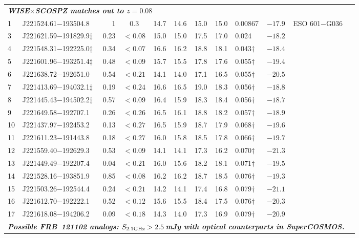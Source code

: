 \documentclass[twocolumn]{aastex63}
\begin{document}
\begin{table*}
\begin{tabular}{llrccccclllc}
\multicolumn{9}{l}{\emph{\bf WISE$\times$SCOSPZ matches out to $z=0.08$}} \\
1 & J221524.61$-$193504.8 & 1 & 0.3 & 14.7 & 14.6 & 15.0 & 15.0 & 0.00867 & $-17.9$ & ESO 601$-$G036 \\
3 & J221621.59$-$191829.9$\ddagger$ & 0.23 & $<0.08$ & 15.0 & 15.0 & 17.5 & 17.0 & 0.024 & $-18.2$ &  \\
4 & J221548.31$-$192225.0$\ddagger$ & 0.34 & $<0.07$ & 16.6 & 16.2 & 18.8 & 18.1 & 0.043$\dagger$ & $-18.4$ \\
5 & J221601.96$-$193251.4$\ddagger$ & 0.48 & $<0.09$ & 15.7 & 15.5 & 17.8 & 17.6 & 0.055$\dagger$ & $-19.4$ \\
6 & J221638.72$-$192651.0 & 0.54 & $<0.21$ & 14.1 & 14.0 & 17.1 & 16.5 & 0.055$\dagger$ & $-20.5$\\
7 & J221413.69$-$194032.1$\ddagger$ & 0.19 & $<0.24$ & 16.6 & 16.5 & 19.0 & 18.3 & 0.056$\dagger$ & $-18.8$ \\
8 & J221445.43$-$194502.2$\ddagger$ & 0.57 & $<0.09$ & 16.4 & 15.9 & 18.3 & 18.4 & 0.056$\dagger$ & $-18.7$ \\ 
9 & J221649.58$-$192707.1 & 0.26 & $<0.26$ & 16.5 & 16.1 & 18.8 & 18.2 & 0.057$\dagger$ & $-18.9$ \\
10 & J221437.97$-$192453.2 & 0.13 & $<0.27$ & 16.5 & 15.9 & 18.7 & 17.9 & 0.068$\dagger$ & $-19.6$ & \\
11 & J221611.23$-$191443.8 & 0.18 & $<0.27$& 16.0 & 15.8 & 18.5 & 17.8 & 0.066$\dagger$ & $-19.7$ & \\
12 & J221559.40$-$192629.3 & 0.53 & $<0.09$ & 14.1 & 14.1 & 17.3 & 16.2 & 0.070$\dagger$ & $-21.3$ & \\
13 & J221449.49$-$192207.4 & 0.04 & $<0.21$ & 16.0 & 15.6 & 18.2  & 18.1 & 0.071$\dagger$ & $-19.5$ \\ 
14 & J221528.16$-$193851.9 & 0.85 & $<0.08$ & 16.2 & 16.2 & 18.7  & 18.5 & 0.076$\dagger$ & $-19.3$ \\         
15 & J221503.26$-$192544.4 & 0.24 & $<0.21$ & 14.2 & 14.1 & 17.4  & 16.8 & 0.079$\dagger$ & $-21.1$ \\ 
16 & J221612.70$-$192222.1 & 0.52 & $<0.12$ & 15.6 & 15.5 & 18.4 & 17.5 & 0.076$\dagger$ & $-20.3$ \\    
17 & J221618.08$-$194206.2 & 0.09 & $<0.18$ & 14.3 & 14.0 & 17.3 & 16.9 & 0.079$\dagger$ & $-20.9$ \\   
\multicolumn{11}{l}{\emph{\bf Possible FRB~121102 analogs: $S_{\rm 2.1 GHz}>2.5$\,mJy with optical counterparts in SuperCOSMOS. }} \\

\end{tabular}
\end{table*}
\end{document}
